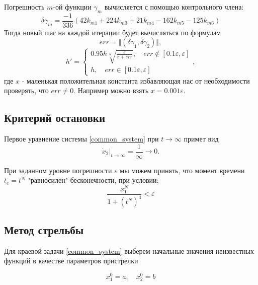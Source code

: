 \documentclass[a4paper,12pt]{article}
\begin{document}
Погрешность \(m\)-ой функции \(\gamma_{m}\) вычисляется с помощью контрольного члена:
\begin{equation*}
  \delta\gamma_{m} = \frac{-1}{336}\left(42 k_{m1}+224k_{m3}+21k_{m4}-162 k_{m5}-125 k_{m6}\right)
\end{equation*}
Тогда новый шаг на каждой итерации будет вычисляться по формулам
\begin{equation*}
  err = \Vert (\delta\gamma_{1}, \delta\gamma_{2})\Vert,
\end{equation*}
\begin{equation*}
  h'=\begin{cases}
    0.95 h \sqrt[5]{\frac{\varepsilon}{x+err}}, \quad err \not\in [0.1 \varepsilon, \varepsilon] \\
    h, \quad  err \in [0.1 \varepsilon, \varepsilon]
  \end{cases},
\end{equation*}
где \(x\) - маленькая
положительная константа избавляющая нас от необходимости проверять, что
\(err \neq 0\). Например можно взять \(x=0.001 \varepsilon\).

\subsection*{Критерий остановки}

Первое уравнение системы \cref{common_system} при \(t\to\infty\) примет вид
\begin{equation}
  \label{stop_cond} \left.\dot{x}_2\right\vert_{t\to\infty}=\frac{1}{\infty}\to 0.
\end{equation}

При заданном уровне погрешности \(\varepsilon\) мы можем принять, что момент времени \(t_e=t^N\) "равносилен" бесконечности, при условии:
\begin{equation*}
  \frac{x^N_1}{1+\left(t^N\right)^4} < \varepsilon
\end{equation*}


\subsection*{Метод стрельбы}

Для краевой задачи \cref{common_system} выберем начальные значения неизвестных функций в качестве параметров пристрелки

\begin{equation*}
  x_1^0=a, \quad x_2^0=b
\end{equation*}
\end{document}
